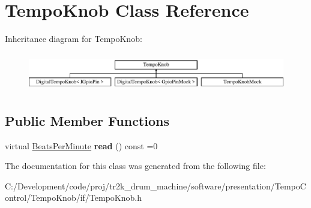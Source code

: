 \hypertarget{class_tempo_knob}{}\section{Tempo\+Knob Class Reference}
\label{class_tempo_knob}
Inheritance diagram for Tempo\+Knob\+:\begin{figure}[H]
\begin{center}
\leavevmode
\includegraphics[height=1.696970cm]{class_tempo_knob}
\end{center}
\end{figure}
\subsection*{Public Member Functions}
\begin{DoxyCompactItemize}
\item 
\mbox{\label{class_tempo_knob_aac8920db810057a523201b0027d6c852}} 
virtual \mbox{\hyperlink{class_beats_per_minute}{Beats\+Per\+Minute}} {\bfseries read} () const =0
\end{DoxyCompactItemize}


The documentation for this class was generated from the following file\+:\begin{DoxyCompactItemize}
\item 
C\+:/\+Development/code/proj/tr2k\+\_\+drum\+\_\+machine/software/presentation/\+Tempo\+Control/\+Tempo\+Knob/if/Tempo\+Knob.\+h\end{DoxyCompactItemize}
